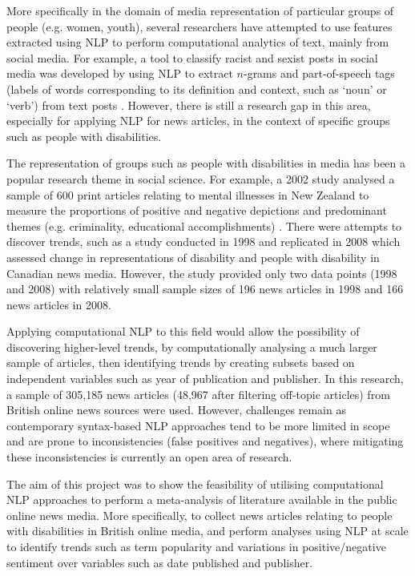 \documentclass{report}
\begin{document}
More specifically in the domain of media representation of particular groups of people (e.g. women, youth), several researchers have attempted to use features extracted using NLP to perform computational analytics of text, mainly from social media.
For example, a tool to classify racist and sexist posts in social media was developed by using NLP to extract $n$-grams and part-of-speech tags (labels of words corresponding to its definition and context, such as `noun' or `verb') from text posts \cite{waseem2016you}.
However, there is still a research gap in this area, especially for applying NLP for news articles, in the context of specific groups such as people with disabilities.

The representation of groups such as people with disabilities in media has been a popular research theme in social science.
For example, a 2002 study analysed a sample of 600 print articles relating to mental illnesses in New Zealand to measure the proportions of positive and negative depictions and predominant themes (e.g. criminality, educational accomplishments) \cite{coverdale2002depictions}.
There were attempts to discover trends, such as a study conducted in 1998 \cite{gold1999media} and replicated in 2008 \cite{devotta2013representations} which assessed change in representations of disability and people with disability in Canadian news media.
However, the study provided only two data points (1998 and 2008) with relatively small sample sizes of 196 news articles in 1998 and 166 news articles in 2008.

Applying computational NLP to this field would allow the possibility of discovering higher-level trends, by computationally analysing a much larger sample of articles, then identifying trends by creating subsets based on independent variables such as year of publication and publisher.
In this research, a sample of 305,185 news articles (48,967 after filtering off-topic articles) from British online news sources were used.
However, challenges remain as contemporary syntax-based NLP approaches tend to be more limited in scope and are prone to inconsistencies (false positives and negatives), where mitigating these inconsistencies is currently an open area of research. %

The aim of this project was to show the feasibility of utilising computational NLP approaches to perform a meta-analysis of literature available in the public online news media.
More specifically, to collect news articles relating to people with disabilities in British online media, and perform analyses using NLP at scale to identify trends such as term popularity and variations in positive/negative sentiment over variables such as date published and publisher.
\end{document}
